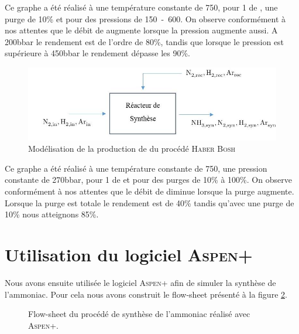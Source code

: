 Ce graphe \cite{fig:purgePression} a été réalisé à une température constante de \unit{750}{\kelvin}, pour \unit{1}{\mole\per\second} de , une purge de 10\% et pour des pressions de \unit{150-600}{\bbar}. On observe conformément à nos attentes que le débit de  augmente lorsque la pression augmente aussi. A \unit{200}{bbar} le rendement est de l'ordre de 80\%, tandis que lorsque le pression est supérieure à \unit{450}{bbar} le rendement dépasse les 90\%.


\begin{figure}
	\centering
	\includegraphics[scale=0.5]{media/purge.jpg} 
	\caption{Modélisation de la production de  du procédé \textsc{Haber Bosh}}
	\label{fig:purge}
\end{figure}

Ce graphe \cite{fig:purge} a été réalisé à une température constante de \unit{750}{\kelvin}, une pression constante de \unit{270}{bbar}, pour \unit{1}{\mole\per\second} de  et pour des purges de 10\% à 100\%. On observe conformément à nos attentes que le débit de  diminue lorsque la purge augmente. Lorsque la purge est totale le rendement est de 40\% tandis qu'avec une purge de 10\% nous atteignons 85\%.


\section{Utilisation du logiciel \textsc{Aspen+}}
Nous avons ensuite utilisée le logiciel \textsc{Aspen+}
afin de simuler la synthèse de l'ammoniac. Pour cela
nous avons construit le flow-sheet présenté à la figure
\ref{fig:flow-sheet-aspen}. 

\begin{figure}
	\centering
	\caption{Flow-sheet du procédé de synthèse de l'ammoniac
	réalisé avec \textsc{Aspen+}.}
	\label{fig:flow-sheet-aspen}
\end{figure}

